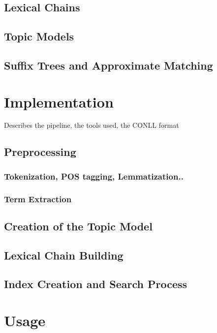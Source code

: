 \documentclass[11pt, a4paper, abstraction]{scrartcl}
\begin{document}
\subsection{Lexical Chains}

\subsection{Topic Models}

\subsection{Suffix Trees and Approximate Matching}

\section{Implementation}

Describes the pipeline, the tools used, the CONLL format

\subsection{Preprocessing}

\subsubsection{Tokenization, POS tagging, Lemmatization..}
\subsubsection{Term Extraction}

\subsection{Creation of the Topic Model}

\subsection{Lexical Chain Building}

\subsection{Index Creation and Search Process}

\section{Usage}
\end{document}
